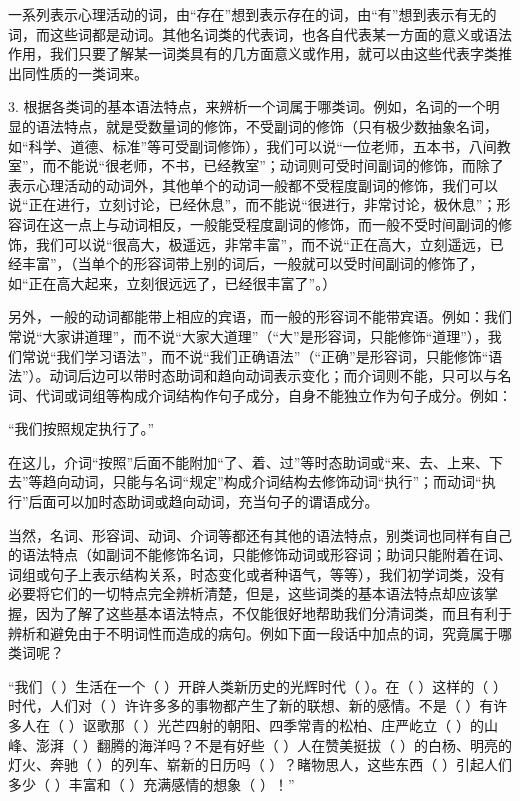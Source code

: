 一系列表示心理活动的词，由“存在”想到表示存在的词，由“有”想到表示有无的词，而这些词都是动词。其他名词类的代表词，也各自代表某一方面的意义或语法作用，我们只要了解某一词类具有的几方面意义或作用，就可以由这些代表字类推出同性质的一类词来。

3. 根据各类词的基本语法特点，来辨析一个词属于哪类词。例如，名词的一个明显的语法特点，就是受数量词的修饰，不受副词的修饰（只有极少数抽象名词，如“科学、道德、标准”等可受副词修饰），我们可以说“一位老师，五本书，八间教室”，而不能说“很老师，不书，已经教室”；动词则可受时间副词的修饰，而除了表示心理活动的动词外，其他单个的动词一般都不受程度副词的修饰，我们可以说“正在进行，立刻讨论，已经休息”，而不能说“很进行，非常讨论，极休息”；形容词在这一点上与动词相反，一般能受程度副词的修饰，而一般不受时间副词的修饰，我们可以说“很高大，极遥远，非常丰富”，而不说“正在高大，立刻遥远，已经丰富”，（当单个的形容词带上别的词后，一般就可以受时间副词的修饰了，如“正在高大起来，立刻很远远了，已经很丰富了”。）

另外，一般的动词都能带上相应的宾语，而一般的形容词不能带宾语。例如：我们常说“大家讲道理”，而不说“大家大道理”（“大”是形容词，只能修饰“道理”），我们常说“我们学习语法”，而不说“我们正确语法”（“正确”是形容词，只能修饰“语法”）。动词后边可以带时态助词和趋向动词表示变化；而介词则不能，只可以与名词、代词或词组等构成介词结构作句子成分，自身不能独立作为句子成分。例如：

“我们按照规定执行了。”

在这儿，介词“按照”后面不能附加“了、着、过”等时态助词或“来、去、上来、下去”等趋向动词，只能与名词“规定”构成介词结构去修饰动词“执行”；而动词“执行”后面可以加时态助词或趋向动词，充当句子的谓语成分。

当然，名词、形容词、动词、介词等都还有其他的语法特点，别类词也同样有自己的语法特点（如副词不能修饰名词，只能修饰动词或形容词；助词只能附着在词、词组或句子上表示结构关系，时态变化或者种语气，等等），我们初学词类，没有必要将它们的一切特点完全辨析清楚，但是，这些词类的基本语法特点却应该掌握，因为了解了这些基本语法特点，不仅能很好地帮助我们分清词类，而且有利于辨析和避免由于不明词性而造成的病句。例如下面一段话中加点的词，究竟属于哪类词呢？

“我们（ ）生活在一个（ ）开辟人类新历史的光辉时代（ ）。在（ ）这样的（ ）时代，人们对（ ）许许多多的事物都产生了新的联想、新的感情。不是（ ）有许多人在（ ）讴歌那（ ）光芒四射的朝阳、四季常青的松柏、庄严屹立（ ）的山峰、澎湃（ ）翻腾的海洋吗？不是有好些（ ）人在赞美挺拔（ ）的白杨、明亮的灯火、奔驰（ ）的列车、崭新的日历吗（ ）？睹物思人，这些东西（ ）引起人们多少（ ）丰富和（ ）充满感情的想象（ ）！”

